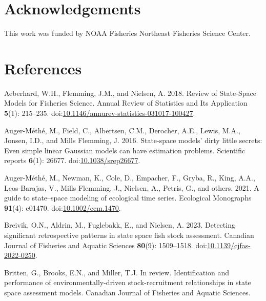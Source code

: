 \documentclass[
  12pt,
]{article}
\newlength{\cslhangindent}
\newlength{\cslentryspacingunit} %
\newenvironment{CSLReferences}[2] %
 {%
  \setlength{\parindent}{0pt}
  \ifodd #1
  \let\oldpar\par
  \def\par{\hangindent=\cslhangindent\oldpar}
  \fi
  \setlength{\parskip}{#2\cslentryspacingunit}
 }%
 {}
\begin{document}
\hypertarget{acknowledgements}{%
\section*{Acknowledgements}\label{acknowledgements}}

This work was funded by NOAA Fisheries Northeast Fisheries Science
Center.

\pagebreak

\hypertarget{references}{%
\section*{References}\label{references}}

\hypertarget{refs}{}
\begin{CSLReferences}{1}{0}
\leavevmode{}%
Aeberhard, W.H., Flemming, J.M., and Nielsen, A. 2018. Review of
{State}-{Space Models} for {Fisheries Science}. Annual Review of
Statistics and Its Application \textbf{5}(1): 215--235.
doi:\href{https://doi.org/10.1146/annurev-statistics-031017-100427}{10.1146/annurev-statistics-031017-100427}.

\leavevmode{}%
Auger-Méthé, M., Field, C., Albertsen, C.M., Derocher, A.E., Lewis,
M.A., Jonsen, I.D., and Mills Flemming, J. 2016. State-space models'
dirty little secrets: Even simple linear {G}aussian models can have
estimation problems. Scientific reports \textbf{6}(1): 26677.
doi:\href{https://doi.org/10.1038/srep26677}{10.1038/srep26677}.

\leavevmode{}%
Auger-Méthé, M., Newman, K., Cole, D., Empacher, F., Gryba, R., King,
A.A., Leos-Barajas, V., Mills Flemming, J., Nielsen, A., Petris, G., and
others. 2021. A guide to state--space modeling of ecological time
series. Ecological Monographs \textbf{91}(4): e01470.
doi:\href{https://doi.org/10.1002/ecm.1470}{10.1002/ecm.1470}.

\leavevmode{}%
Breivik, O.N., Aldrin, M., Fuglebakk, E., and Nielsen, A. 2023.
Detecting significant retrospective patterns in state space fish stock
assessment. Canadian Journal of Fisheries and Aquatic Sciences
\textbf{80}(9): 1509--1518.
doi:\href{https://doi.org/10.1139/cjfas-2022-0250}{10.1139/cjfas-2022-0250}.

\leavevmode{}%
Britten, G., Brooks, E.N., and Miller, T.J. In review. Identification
and performance of environmentally-driven stock-recruitment
relationships in state space assessment models. Canadian Journal of
Fisheries and Aquatic Sciences.


\end{CSLReferences}
\end{document}
